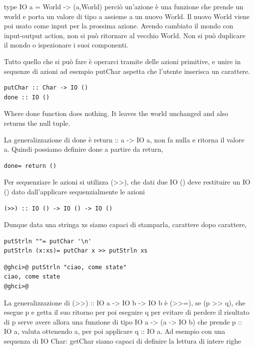 \documentclass[a4papert]{article}
\begin{document}
type IO a = World -> (a,World) perciò un'azione è una funzione che prende un world e porta un valore di tipo a assieme a un nuovo World. Il nuovo World viene poi usato come input per la prossima azione. Avendo cambiato il mondo con input-output action, non si può ritornare al vecchio World. Non si può duplicare il mondo o ispezionare i suoi componenti.


Tutto quello che si può fare è operarci tramite delle azioni primitive, e unire in sequenze di azioni ad esempio putChar aspetta che l'utente inserisca un carattere.

\begin{lstlisting}[style=haskellstyle]
putChar :: Char -> IO ()
done :: IO ()
\end{lstlisting}

Where done function does nothing. It leaves the world unchanged and also returns the null tuple.


La generalizzazione di done è return :: a -> IO a, non fa nulla e ritorna il valore a. Quindi possiamo definire done a partire da return,


\begin{lstlisting}[style=haskellstyle]
done= return ()
\end{lstlisting}


Per sequenziare le azioni si utilizza (>>), che dati due IO () deve restituire un IO () dato dall'applicare sequenzialmente le azioni

\begin{lstlisting}[style=haskellstyle]
(>>) :: IO () -> IO () -> IO ()
\end{lstlisting}


Dunque data una stringa xs siamo capaci di stamparla, carattere dopo carattere,

\begin{lstlisting}[style=haskellstyle]
putStrln ""= putChar '\n'
putStrln (x:xs)= putChar x >> putStrln xs

\end{lstlisting}
\begin{lstlisting}[style=ghcistyle]
@ghci>@ putStrln "ciao, come state"
ciao, come state
@ghci>@ 
\end{lstlisting}


La generalizzazione di (>>) :: IO a -> IO b -> IO b è (>>=), se (p >> q), che esegue p e getta il suo ritorno per poi eseguire q per evitare di perdere il risultato di p serve avere allora una funzione di tipo IO a -> (a -> IO b) che prende p :: IO a, valuta ottenendo a, per poi applicare q :: IO a. Ad esempio con una sequenza di IO Char: getChar siamo capaci di definire la lettura di intere righe
\end{document}
